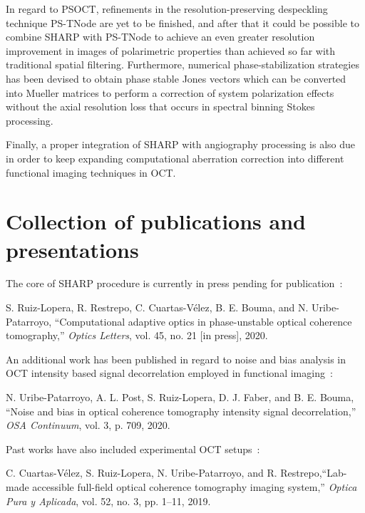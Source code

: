 In regard to PSOCT, refinements in the resolution-preserving despeckling technique  PS-TNode are yet to be finished, and after that it could be possible to combine SHARP with PS-TNode to achieve an even greater resolution improvement in images of polarimetric properties than achieved so far with traditional spatial filtering. Furthermore, numerical phase-stabilization strategies has been devised to obtain phase stable Jones vectors which can be converted into Mueller matrices to perform a correction of system polarization effects without the axial resolution loss that occurs in spectral binning Stokes processing.

Finally, a proper integration of SHARP with angiography processing is also due in order to keep expanding computational aberration correction into different functional imaging techniques in OCT.

\section{Collection of publications and presentations}

The core of SHARP procedure is currently in press pending for publication~\cite{Ruiz-Lopera2020_Computational}:

S. Ruiz-Lopera, R. Restrepo, C. Cuartas-Vélez, B. E. Bouma, and N. Uribe-Patarroyo, ``Computational adaptive optics in phase-unstable optical coherence tomography,'' \textit{Optics Letters}, vol. 45, no. 21 [in press], 2020.

An additional work has been published in regard to noise and bias analysis in OCT intensity based signal decorrelation employed in functional imaging~\cite{Uribe-Patarroyo2020_Noise}:

N. Uribe-Patarroyo, A. L. Post, S. Ruiz-Lopera, D. J. Faber, and B. E. Bouma, ``Noise and bias in optical coherence tomography intensity signal decorrelation,'' \textit{OSA Continuum}, vol. 3, p. 709, 2020.

Past works have also included experimental OCT setups~\cite{Cuartas-Velez2019_Labmade, Ruiz-Lopera2018_Design}:

C. Cuartas-Vélez, S. Ruiz-Lopera, N. Uribe-Patarroyo, and R. Restrepo,``Lab-made accessible full-field optical coherence tomography imaging system,'' \textit{Optica Pura y Aplicada}, vol. 52, no. 3, pp. 1–11, 2019.

